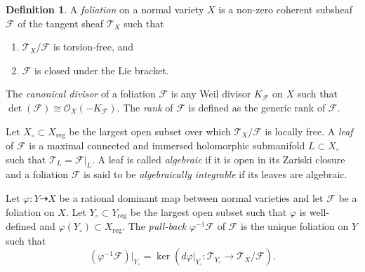 \documentclass[12pt,twoside]{amsart}
\DeclareMathOperator{\reg}{reg}
\theoremstyle{definition}
\newtheorem{defn}[thm]{Definition}
\begin{document}
\begin{defn}
	A {\it foliation} on a normal variety $X$ is a non-zero coherent subsheaf $\mathcal{F}$ of the tangent sheaf $\mathcal{T}_X$ such that 
	\begin{enumerate}
		\item $\mathcal{T}_X/\mathcal{F}$ is torsion-free, and
		
		\item $\mathcal{F}$ is closed under the Lie bracket.
	\end{enumerate} 
	The {\it canonical divisor} of a foliation $\mathcal{F}$ is any Weil divisor $K_{\mathcal{F}}$ on $X$ such that $\det(\mathcal{F})\cong \mathcal{O}_X(-K_{\mathcal{F}})$. The \emph{rank} of $\mathcal{F}$ is defined as the generic rank of $\mathcal{F}$.
\end{defn}

Let $X_{\circ}\subset X_{\reg}$ be the largest open subset over which $\mathcal{T}_X/\mathcal{F}$ is locally free. A \emph{leaf} of $\mathcal{F}$ is a maximal connected and immersed holomorphic submanifold $L\subset X_{\circ}$ such that $\mathcal{T}_L=\mathcal{F}|_L$. A leaf is called \emph{algebraic} if it is open in its Zariski closure and a foliation $\mathcal{F}$ is said to be \emph{algebraically integrable} if its leaves are algebraic. 

Let $\varphi\colon Y\dashrightarrow X$ be a rational dominant map between normal varieties and let $\mathcal{F}$ be a foliation on $X$. Let $Y_{\circ}\subset Y_{\reg}$ be the largest open subset such that $\varphi$ is well-defined and $\varphi(Y_{\circ})\subset X_{\reg}$. The \emph{pull-back} $\varphi^{-1}\mathcal{F}$ of $\mathcal{F}$ is the unique foliation on $Y$ such that 
\[
(\varphi^{-1}\mathcal{F})|_{Y_{\circ}}=\ker(d\varphi|_{Y_{\circ}}\colon \mathcal{T}_{Y_{\circ}} \rightarrow \mathcal{T}_{X}/\mathcal{F}).
\]
\end{document}
